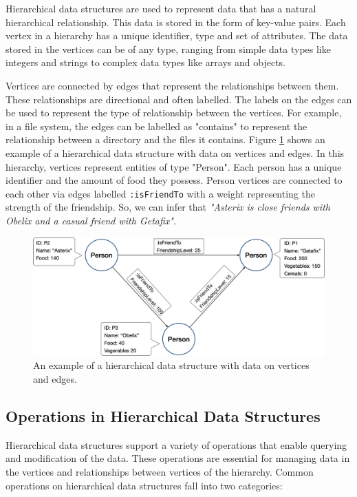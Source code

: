 Hierarchical data structures are used to represent data that has a natural hierarchical relationship. This data is stored in the form of key-value pairs. Each vertex in a hierarchy has a unique identifier, type and set of attributes. The data stored in the vertices can be of any type, ranging from simple data types like integers and strings to complex data types like arrays and objects. 

Vertices are connected by edges that represent the relationships between them. These relationships are directional and often labelled. The labels on the edges can be used to represent the type of relationship between the vertices. For example, in a file system, the edges can be labelled as "contains" to represent the relationship between a directory and the files it contains. Figure \ref{fig:hierarchicalDS} shows an example of a hierarchical data structure with data on vertices and edges. In this hierarchy, vertices represent entities of type "Person". Each person has a unique identifier and the amount of food they possess. Person vertices are connected to each other via edges labelled \texttt{:isFriendTo} with a weight representing the strength of the friendship. So, we can infer that \emph{"Asterix is close friends with Obelix and a casual friend with Getafix"}.


\begin{figure}[h]
    \centering
    \captionsetup{justification=centering}
    \includegraphics[width=\textwidth]{figures/HierarchicalDSExample.png}
    \caption{An example of a hierarchical data structure with data on vertices and edges.}
    \label{fig:hierarchicalDS}
\end{figure}




\subsection{Operations in Hierarchical Data Structures}

Hierarchical data structures support a variety of operations that enable querying and modification of the data. These operations are essential for managing data in the vertices and relationships between vertices of the hierarchy. Common operations on hierarchical data structures fall into two categories:

